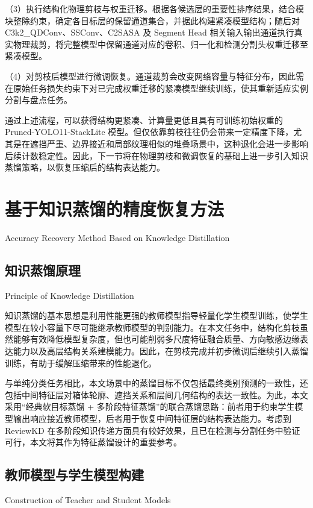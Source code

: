 \par\noindent
（3）执行结构化物理剪枝与权重迁移。根据各候选层的重要性排序结果，结合模块整除约束，确定各目标层的保留通道集合，并据此构建紧凑模型结构；随后对 C3k2\_QDConv、SSConv、C2SASA 及 Segment Head 相关输入输出通道执行真实物理裁剪，将完整模型中保留通道对应的卷积、归一化和检测分割头权重迁移至紧凑模型。

\par\noindent
（4）对剪枝后模型进行微调恢复。通道裁剪会改变网络容量与特征分布，因此需在原始任务损失约束下对已完成权重迁移的紧凑模型继续训练，使其重新适应实例分割与盘点任务。

通过上述流程，可以获得结构更紧凑、计算量更低且具有可训练初始权重的 Pruned-YOLO11-StackLite 模型。但仅依靠剪枝往往仍会带来一定精度下降，尤其是在遮挡严重、边界接近和局部纹理相似的堆叠场景中，这种退化会进一步影响后续计数稳定性。因此，下一节将在物理剪枝和微调恢复的基础上进一步引入知识蒸馏策略，以恢复压缩后的结构表达能力。

\section{基于知识蒸馏的精度恢复方法}{Accuracy Recovery Method Based on Knowledge Distillation}

\subsection{知识蒸馏原理}{Principle of Knowledge Distillation}

知识蒸馏的基本思想是利用性能更强的教师模型指导轻量化学生模型训练，使学生模型在较小容量下尽可能继承教师模型的判别能力\cite{hinton2015distilling}。在本文任务中，结构化剪枝虽然能够有效降低模型复杂度，但也可能削弱多尺度特征融合质量、方向敏感边缘表达能力以及高层结构关系建模能力。因此，在剪枝完成并初步微调后继续引入蒸馏训练，有助于缓解压缩带来的性能退化。

与单纯分类任务相比，本文场景中的蒸馏目标不仅包括最终类别预测的一致性，还包括中间特征层对箱体轮廓、遮挡关系和层间几何结构的表达一致性。为此，本文采用“经典软目标蒸馏 + 多阶段特征蒸馏”的联合蒸馏思路：前者用于约束学生模型输出响应接近教师模型，后者用于恢复中间特征层的结构表达能力。考虑到 ReviewKD 在多阶段知识传递方面具有较好效果，且已在检测与分割任务中验证可行\cite{chen2021reviewkd}，本文将其作为特征蒸馏设计的重要参考。

\subsection{教师模型与学生模型构建}{Construction of Teacher and Student Models}

